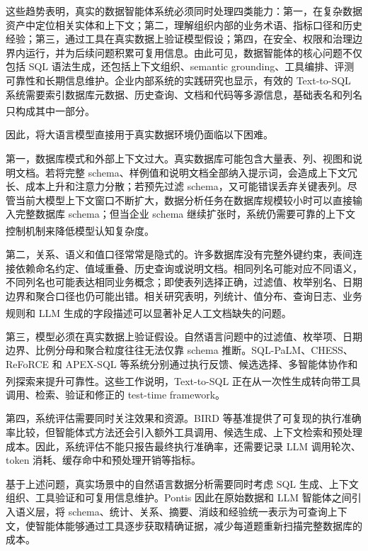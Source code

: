 \documentclass[
    bachelor,
    pdflinks,
]{xjtuthesis}
\newcommand{\upcite}[1]{\textsuperscript{\cite{#1}}}
\begin{document}
这些趋势表明，真实的数据智能体系统必须同时处理四类能力：第一，在复杂数据资产中定位相关实体和上下文；第二，理解组织内部的业务术语、指标口径和历史经验；第三，通过工具在真实数据上验证模型假设；第四，在安全、权限和治理边界内运行，并为后续问题积累可复用信息。由此可见，数据智能体的核心问题不仅包括 SQL 语法生成，还包括上下文组织、semantic grounding、工具编排、评测可靠性和长期信息维护。企业内部系统的实践研究也显示，有效的 Text-to-SQL 系统需要索引数据库元数据、历史查询、文档和代码等多源信息，基础表名和列名只构成其中一部分\upcite{chen2025enterpriseTextToSQL,johnson2024querygpt}。

因此，将大语言模型直接用于真实数据环境仍面临以下困难。

第一，数据库模式和外部上下文过大。真实数据库可能包含大量表、列、视图和说明文档。若将完整 schema、样例值和说明文档全部纳入提示词，会造成上下文冗长、成本上升和注意力分散；若预先过滤 schema，又可能错误丢弃关键表列。尽管当前大模型上下文窗口不断扩大，数据分析任务在数据库规模较小时可以直接输入完整数据库 schema；但当企业 schema 继续扩张时，系统仍需要可靠的上下文控制机制来降低模型认知复杂度\upcite{maamari2024deathSchemaLinking}。

第二，关系、语义和值口径常常是隐式的。许多数据库没有完整外键约束，表间连接依赖命名约定、值域重叠、历史查询或说明文档。相同列名可能对应不同语义，不同列名也可能表达相同业务概念；即使表列选择正确，过滤值、枚举别名、日期边界和聚合口径也仍可能出错。相关研究表明，列统计、值分布、查询日志、业务规则和 LLM 生成的字段描述可以显著补足人工文档缺失的问题\upcite{shkapenyuk2025metadata,wang2025schemaGraphQA,rissaki2024schemaRefinement}。

第三，模型必须在真实数据上验证假设。自然语言问题中的过滤值、枚举项、日期边界、比例分母和聚合粒度往往无法仅靠 schema 推断。SQL-PaLM、CHESS、ReFoRCE 和 APEX-SQL 等系统分别通过执行反馈、候选选择、多智能体协作和列探索来提升可靠性\upcite{sun2024sqlpalm,talaei2024chess,deng2025reforce,cao2026apexsql}。这些工作说明，Text-to-SQL 正在从一次性生成转向带工具调用、检索、验证和修正的 test-time framework。

第四，系统评估需要同时关注效果和资源。BIRD 等基准提供了可复现的执行准确率比较，但智能体式方法还会引入额外工具调用、候选生成、上下文检索和预处理成本。因此，系统评估不能只报告最终执行准确率，还需要记录 LLM 调用轮次、token 消耗、缓存命中和预处理开销等指标。

基于上述问题，真实场景中的自然语言数据分析需要同时考虑 SQL 生成、上下文组织、工具验证和可复用信息维护。Pontis 因此在原始数据和 LLM 智能体之间引入语义层，将 schema、统计、关系、摘要、消歧和经验统一表示为可查询上下文，使智能体能够通过工具逐步获取精确证据，减少每道题重新扫描完整数据库的成本。
\end{document}
